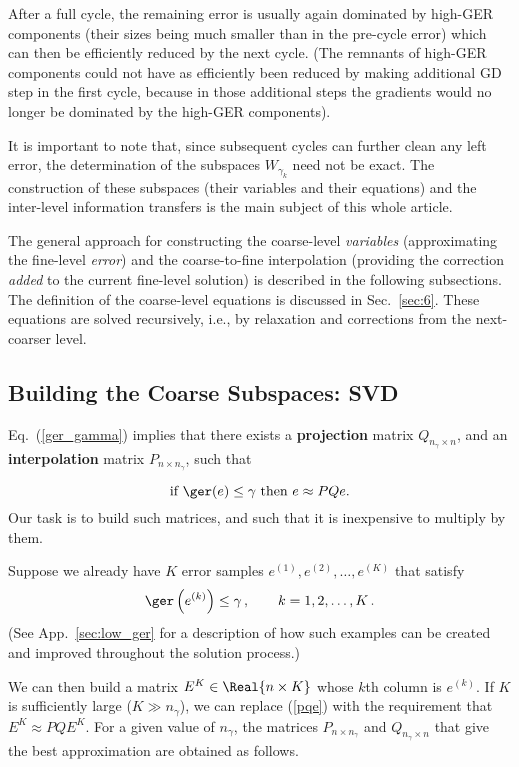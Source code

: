 \documentclass{article} %
\begin{document}
After a full cycle, the remaining error is usually again dominated by high-GER components (their sizes being much smaller than in the pre-cycle error) which can then be efficiently reduced by the next cycle. (The remnants of high-GER components could not have as efficiently been reduced by making additional GD step in the first cycle, because in those additional steps the gradients would no longer be dominated by the high-GER components).

It is important to note that, since subsequent cycles can further clean any left error, the determination of the subspaces $W_{\gamma_k}$ need not be exact. The construction of these subspaces (their variables and their equations) and the inter-level information transfers is the main subject of this whole article.

The general approach for constructing the coarse-level {\it variables} (approximating the fine-level {\it error}) and the coarse-to-fine interpolation (providing the correction {\it added} to the current fine-level solution) is described in the following subsections. The definition of the coarse-level equations is discussed in Sec.~\ref{sec:6}. These equations are solved recursively, i.e., by relaxation and corrections from the next-coarser level.

\subsection{Building the Coarse Subspaces: SVD}
\label{sec:w_gamma}

Eq.~(\ref{ger_gamma}) implies that there exists a \textbf{projection} matrix $Q_{n_{\gamma} \times n}$, and an \textbf{interpolation} matrix $P_{n \times n_{\gamma}}$, such that

\begin{equation}
	{\mbox{if $\ger(e) \leq \gamma$ then $e \approx P Q e$.}}
	\label{pqe}
\end{equation}
Our task is to build such matrices, and such that it is inexpensive to multiply by them.

Suppose we already have $K$ error samples $e^{(1)}, e^{(2)}, \dots, e^{(K)}$ that satisfy
\begin{equation}
	\ger\left(e^{(k)} \right) \leq \gamma\,, \qquad k = 1, 2, \dots, K\,.
	\label{ger_ek}
\end{equation}
(See App.~\ref{sec:low_ger} for a description of how such examples can be created and improved throughout the solution process.)

We can then build a matrix $E^K \in \Real {n \times K}$ whose $k$th column is $e^{(k)}$. If $K$ is sufficiently large ($K \gg n_{\gamma}$), we can replace (\ref{pqe}) with the requirement that $E^K \approx P Q E^K$. For a given value of $n_{\gamma}$, the matrices $P_{n \times n_{\gamma}}$ and $Q_{n_{\gamma} \times n}$ that give the best approximation are obtained as follows.
\end{document}
